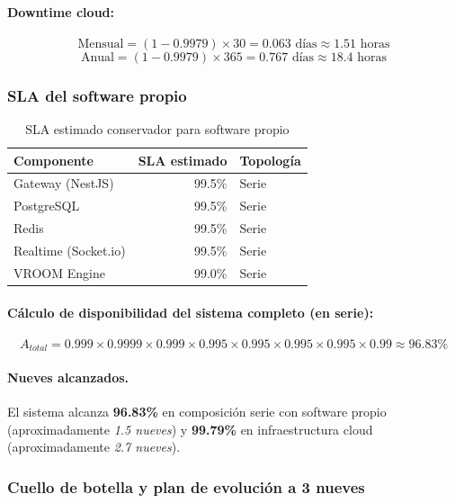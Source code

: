 \documentclass[12pt,a4paper,oneside]{article}
\begin{document}
\paragraph{Downtime cloud:}
\[
\text{Mensual} = (1 - 0.9979) \times 30 = 0.063 \text{ d\'ias} \approx 1.51 \text{ horas}
\]
\[
\text{Anual} = (1 - 0.9979) \times 365 = 0.767 \text{ d\'ias} \approx 18.4 \text{ horas}
\]

\subsubsection{SLA del software propio}

\begin{table}[H]
\centering
\caption{SLA estimado conservador para software propio}
\label{tab:sla-software}
\small
\begin{tabular}{lrl}
\toprule
\textbf{Componente} & \textbf{SLA estimado} & \textbf{Topolog\'ia} \\
\midrule
Gateway (NestJS)        & 99.5\% & Serie \\
PostgreSQL              & 99.5\% & Serie \\
Redis                   & 99.5\% & Serie \\
Realtime (Socket.io)    & 99.5\% & Serie \\
VROOM Engine            & 99.0\% & Serie \\
\bottomrule
\end{tabular}
\end{table}

\paragraph{C\'alculo de disponibilidad del sistema completo (en serie):}
\[
A_{total} = 0.999 \times 0.9999 \times 0.999 \times 0.995 \times 0.995 \times 0.995 \times 0.995 \times 0.99 \approx \mathbf{96.83\%}
\]

\paragraph{Nueves alcanzados.} El sistema alcanza \textbf{96.83\%} en composici\'on serie con software propio (aproximadamente \emph{1.5 nueves}) y \textbf{99.79\%} en infraestructura cloud (aproximadamente \emph{2.7 nueves}).

\subsubsection{Cuello de botella y plan de evoluci\'on a 3 nueves}
\end{document}
